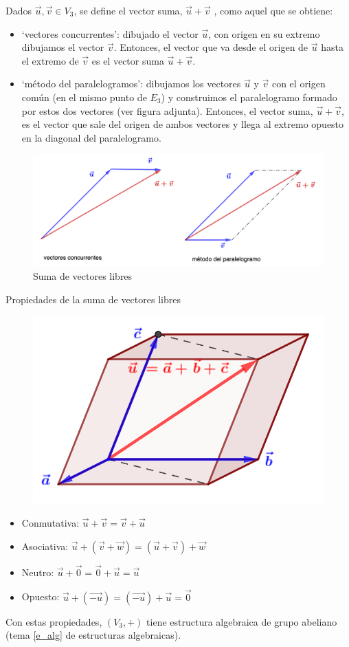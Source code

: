 \begin{defi}
Dados $\vec u, \vec v \in V_3$, se define el vector suma, $\vec u + \vec v$	,  como aquel que se obtiene:

\begin{multicols}{2}
\begin{itemize}
\item `vectores concurrentes': dibujado el vector $\vec u$, con origen en su extremo dibujamos el vector $\vec v$. Entonces, el vector que va desde el origen de $\vec u$ hasta el extremo de $\vec v$ es el vector suma $\vec u + \vec v$.
\item `método del paralelogramos': dibujamos los vectores $\vec u$ y  $\vec v$  con el origen común (en el mismo punto de $E_3$) y construimos el paralelogramo formado por estos dos vectores (ver figura adjunta). Entonces, el vector suma, $\vec u + \vec v$, es el vector que sale del origen de ambos vectores y llega al extremo opuesto en la diagonal del paralelogramo.	
\end{itemize}

\begin{figure}[H]
	\centering
	\includegraphics[width=.45\textwidth]{imagenes/imagenes09/T09IM02.png}
	\caption*{Suma de vectores libres}
\end{figure}

\end{multicols}
\end{defi}

\begin{prop}{Propiedades de la suma de vectores libres}

\begin{multicols}{2}
\begin{figure}[H]
	\centering
	\includegraphics[width=.4\textwidth]{imagenes/imagenes09/T09IM02b.png}
\end{figure}
\begin{itemize}
\item \footnotesize{Conmutativa: $\vec u + \vec v=\vec v + \vec u$}
\item Asociativa: $\vec u + (\vec v+ \vec w)=(\vec u + \vec v)+\vec w$
\item Neutro: $\vec u + \vec 0=\vec 0+\vec u=\vec u$
\item Opuesto: $\vec u+ (\vec{-u})=(\vec{-u})+\vec u= \vec 0$
\end{itemize}
\end{multicols}
	\textcolor{gris}{\normalsize{Con} estas propiedades, $(V_3,+)$ tiene estructura algebraica de grupo abeliano (tema \ref{e_alg} de estructuras algebraicas).}
\end{prop}

